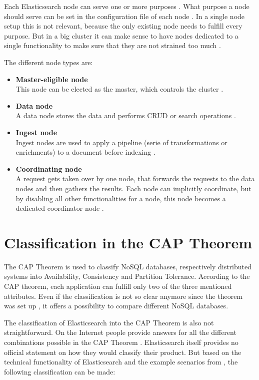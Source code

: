 Each Elasticsearch node can serve one or more purposes \autocite{elastic2019_10}. What purpose a node should serve can be set in the configuration file of each node \autocite{elastic2019_10}. In a single node setup this is not relevant, because the only existing node needs to fulfill every purpose. But in a big cluster it can make sense to have nodes dedicated to a single functionality to make sure that they are not strained too much \autocite{elastic2019_10}.

The different node types are:
\begin{itemize}
    \item \textbf{Master-eligible node} \\
    This node can be elected as the master, which controls the cluster \autocite{elastic2019_10}.
    \item \textbf{Data node} \\
    A data node stores the data and performs CRUD or search operations \autocite{elastic2019_10}.
    \item \textbf{Ingest node} \\
    Ingest nodes are used to apply a pipeline (serie of transformations or enrichments) to a document before indexing \autocite{elastic2019_10}.
    \item \textbf{Coordinating node} \\
    A request gets taken over by one node, that forwards the requests to the data nodes and then gathers the results. Each node can implicitly coordinate, but by disabling all other functionalities for a node, this node becomes a dedicated coordinator node \autocite{elastic2019_10}.
\end{itemize}

\section{Classification in the CAP Theorem}
The CAP Theorem is used to classify NoSQL databases, respectively distributed systems into Availability, Consistency and Partition Tolerance. According to the CAP theorem, each application can fulfill only two of the three mentioned attributes. Even if the classification is not so clear anymore since the theorem was set up \autocite{brewere2012}, it offers a possibility to compare different NoSQL databases.
 
The classification of Elasticsearch into the CAP Theorem is also not straightforward. On the Internet people provide answers for all the different combinations possible in the CAP Theorem \autocites{longn2014}{synhershkoi2014}. Elasticsearch itself provides no official statement on how they would classify their product. But based on the technical functionality of Elasticsearch and the example scenarios from \autocite{nathanir2019}, the following classification can be made:

